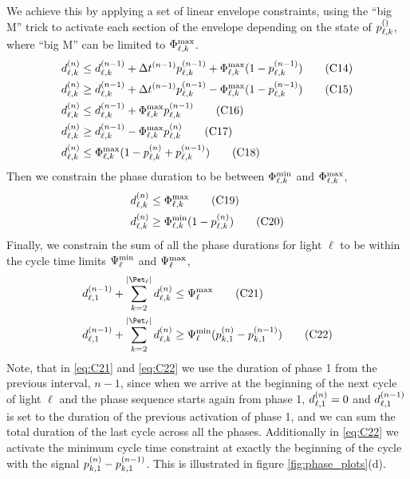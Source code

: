 We achieve this by applying a set of linear envelope constraints, using the ``big M'' trick to activate each section of the envelope depending on the state of $\p[]{\ell}{k}$, where ``big M'' can be limited to $\PTMAX{\ell}{k}$.
\begin{align}
\pd{\ell}{k} &\le \pd[n-1]{\ell}{k} + \DT[n-1] \p[n-1]{\ell}{k} + \PTMAX{\ell}{k} (1 - \p[n-1]{\ell}{k})\tag{C14}\label{eq:C14}\\
\pd{\ell}{k} &\ge \pd[n-1]{\ell}{k} + \DT[n-1] \p[n-1]{\ell}{k} - \PTMAX{\ell}{k} (1 - \p[n-1]{\ell}{k})\tag{C15}\label{eq:C15}\\
\pd{\ell}{k} &\le \pd[n-1]{\ell}{k} + \PTMAX{\ell}{k} \p[n-1]{\ell}{k}\tag{C16}\label{eq:C16}\\
\pd{\ell}{k} &\ge \pd[n-1]{\ell}{k} - \PTMAX{\ell}{k} \p{\ell}{k}\tag{C17}\label{eq:C17}\\
\pd{\ell}{k} &\le \PTMAX{\ell}{k}(1 - \p{\ell}{k} + \p[n-1]{\ell}{k})\tag{C18}\label{eq:C18}
\end{align}
Then we constrain the phase duration to be between $\PTMIN{\ell}{k}$ and $\PTMAX{\ell}{k}$,
\begin{align}
\pd{\ell}{k} &\le \PTMAX{\ell}{k}\tag{C19}\label{eq:C19}\\
\pd{\ell}{k} &\ge \PTMIN{\ell}{k}(1 - \p{\ell}{k})\tag{C20}\label{eq:C20}
\end{align}
Finally, we constrain the sum of all the phase durations for light $\ell$ to be within the cycle time limits $\CTMIN{\ell}$ and $\CTMAX{\ell}$,
\begin{align}
\pd[n-1]{\ell}{1} + \sum\limits_{k=2}^{\Pn} \pd{\ell}{k} &\le \CTMAX{\ell} \tag{C21}\label{eq:C21}\\
\pd[n-1]{\ell}{1} + \sum\limits_{k=2}^{\Pn} \pd{\ell}{k} &\ge \CTMIN{\ell} (\p{k}{1} - \p[n-1]{k}{1})\tag{C22}\label{eq:C22}
\end{align}
Note, that in \ref{eq:C21} and \ref{eq:C22} we use the duration of phase 1 from the previous interval, $n-1$,  since when we arrive at the beginning of the next cycle of light $\ell$ and the phase sequence starts again from phase 1, $\pd{\ell}{1}=0$ and $\pd[n-1]{\ell}{1}$ is set to the duration of the previous activation of phase 1, and we can sum the total duration of the last cycle across all the phases. Additionally in \ref{eq:C22} we activate the minimum cycle time constraint at exactly the beginning of the cycle with the signal $\p{k}{1} - \p[n-1]{k}{1}$. This is illustrated in figure \ref{fig:phase_plots}(d).

